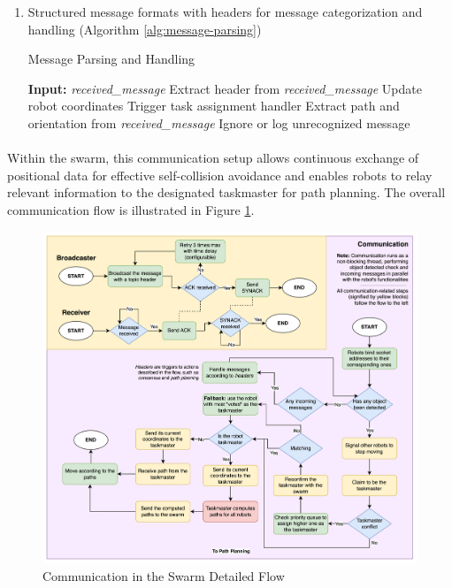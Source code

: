 \begin{enumerate}
    \item Structured message formats with headers for message categorization and handling (Algorithm \ref{alg:message-parsing})
    \begin{algorithm} [H]
        \caption{Message Parsing and Handling}
        \label{alg:message-parsing}
        \begin{algorithmic} [1]
            \STATE \textbf{Input:} \textit{received\_message}
            \STATE Extract header from \textit{received\_message}
                \STATE Update robot coordinates
                \STATE Trigger task assignment handler
                \STATE Extract path and orientation from \textit{received\_message}
            \ELSE
                \STATE Ignore or log unrecognized message
            \ENDIF
        \end{algorithmic}
    \end{algorithm}
\end{enumerate}

\paragraph*{}
Within the swarm, this communication setup allows continuous exchange of positional data for effective self-collision avoidance and enables robots to relay relevant information to the designated taskmaster for path planning. The overall communication flow is illustrated in Figure \ref{fig:communication-flow}.

\begin{figure} [H]
    \centering
    \includegraphics[width=1\linewidth]{assets/images/communication/communication-flow.png}
    \caption{Communication in the Swarm Detailed Flow}
    \label{fig:communication-flow}
\end{figure}

